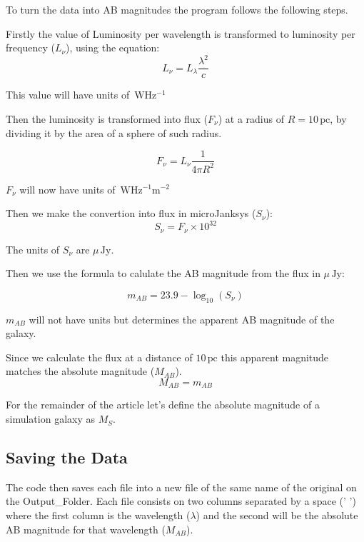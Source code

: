 \documentclass[11pt]{report}
\newcommand{\unit}[1]{\ensuremath{\, \mathrm{#1}}}
\begin{document}
To turn the data into AB magnitudes the program follows the following steps.

Firstly the value of Luminosity per wavelength is transformed to luminosity per frequency ($L_\nu$), using the equation:
\begin{equation}
L_\nu = L_\lambda \frac{\lambda^2}{c}
\end{equation}

This value will have units of $\unit{W Hz^{-1}}$

Then the luminosity is transformed into flux ($F_\nu$) at a radius of $R = 10 \unit{pc}$, by dividing it by the area of a sphere of such radius.

\begin{equation}
F_\nu = L_\nu \frac{1}{4\pi R^2}
\end{equation}

$F_\nu$ will now have units of $\unit{W Hz^{-1}m^{-2}}$

Then we make the convertion into flux in microJanksys ($S_\nu$):
\begin{equation}
S_\nu = F_\nu \times 10^{32}
\end{equation}

The units of $S_\nu$ are $\mu\unit{Jy}$.

Then we use the formula to calulate the AB magnitude from the flux in $\mu \unit{Jy}$:

\begin{equation}
m_{AB} = 23.9 - \log_{10}\left( S_\nu \right)
\end{equation}

$m_{AB}$ will not have units but determines the apparent AB magnitude of the galaxy.

Since we calculate the flux at a distance of $10 \unit{pc}$ this apparent magnitude matches the absolute magnitude ($M_{AB}$).
\begin{equation}
M_{AB} = m_{AB}
\end{equation}

For the remainder of the article let's define the absolute magnitude of a simulation galaxy as $M_{S}$.

\subsection{Saving the Data}

The code then saves each file into a new file of the same name of the original on the Output\_Folder. Each file consists on two columns separated by a space (' ') where the first column is the wavelength ($\lambda$) and the second will be the absolute AB magnitude for that wavelength ($M_{AB}$).
\end{document}
